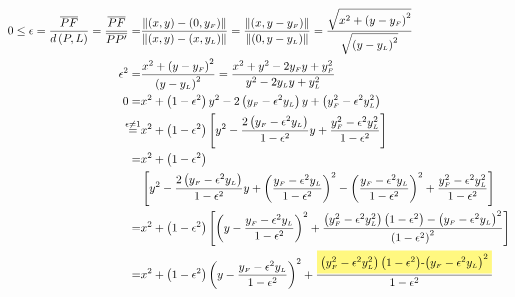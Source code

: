 \documentclass[
]{book}
\theoremstyle{definition}
\theoremstyle{definition}
\theoremstyle{definition}
\theoremstyle{definition}
\theoremstyle{remark}
\begin{document}
\begin{align}
0\le\epsilon=\dfrac{\overline{PF}}{d\left(P,L\right)}=\dfrac{\overline{PF}}{\overline{PP^{\prime}}}= & \dfrac{\left\Vert \left(x,y\right)-\left(0,y_{{\scriptscriptstyle F}}\right)\right\Vert }{\left\Vert \left(x,y\right)-\left(x,y_{{\scriptscriptstyle L}}\right)\right\Vert }=\dfrac{\left\Vert \left(x,y-y_{{\scriptscriptstyle F}}\right)\right\Vert }{\left\Vert \left(0,y-y_{{\scriptscriptstyle L}}\right)\right\Vert }=\dfrac{\sqrt{x^{2}+\left(y-y_{{\scriptscriptstyle F}}\right)^{2}}}{\sqrt{\left(y-y_{{\scriptscriptstyle L}}\right)^{2}}} \label{eq:eccentricity}\\
\epsilon^{2}= & \dfrac{x^{2}+\left(y-y_{{\scriptscriptstyle F}}\right)^{2}}{\left(y-y_{{\scriptscriptstyle L}}\right)^{2}}=\dfrac{x^{2}+y^{2}-2y_{{\scriptscriptstyle F}}y+y_{{\scriptscriptstyle F}}^{2}}{y^{2}-2y_{{\scriptscriptstyle L}}y+y_{{\scriptscriptstyle L}}^{2}}\\
0= & x^{2}+\left(1-\epsilon^{2}\right)y^{2}-2\left(y_{{\scriptscriptstyle F}}-\epsilon^{2}y_{{\scriptscriptstyle L}}\right)y+\left(y_{{\scriptscriptstyle F}}^{2}-\epsilon^{2}y_{{\scriptscriptstyle L}}^{2}\right)\\
\overset{\epsilon\ne1}{=} & x^{2}+\left(1-\epsilon^{2}\right)\left[y^{2}-\dfrac{2\left(y_{{\scriptscriptstyle F}}-\epsilon^{2}y_{{\scriptscriptstyle L}}\right)}{1-\epsilon^{2}}y+\dfrac{y_{{\scriptscriptstyle F}}^{2}-\epsilon^{2}y_{{\scriptscriptstyle L}}^{2}}{1-\epsilon^{2}}\right]\\
= & x^{2}+\left(1-\epsilon^{2}\right)\\
 & \left[y^{2}-\dfrac{2\left(y_{{\scriptscriptstyle F}}-\epsilon^{2}y_{{\scriptscriptstyle L}}\right)}{1-\epsilon^{2}}y+\left(\dfrac{y_{{\scriptscriptstyle F}}-\epsilon^{2}y_{{\scriptscriptstyle L}}}{1-\epsilon^{2}}\right)^{2}-\left(\dfrac{y_{{\scriptscriptstyle F}}-\epsilon^{2}y_{{\scriptscriptstyle L}}}{1-\epsilon^{2}}\right)^{2}+\dfrac{y_{{\scriptscriptstyle F}}^{2}-\epsilon^{2}y_{{\scriptscriptstyle L}}^{2}}{1-\epsilon^{2}}\right]\\
= & x^{2}+\left(1-\epsilon^{2}\right)\left[\left(y-\dfrac{y_{{\scriptscriptstyle F}}-\epsilon^{2}y_{{\scriptscriptstyle L}}}{1-\epsilon^{2}}\right)^{2}+\dfrac{\left(y_{{\scriptscriptstyle F}}^{2}-\epsilon^{2}y_{{\scriptscriptstyle L}}^{2}\right)\left(1-\epsilon^{2}\right)-\left(y_{{\scriptscriptstyle F}}-\epsilon^{2}y_{{\scriptscriptstyle L}}\right)^{2}}{\left(1-\epsilon^{2}\right)^{2}}\right]\\
= & x^{2}+\left(1-\epsilon^{2}\right)\left(y-\dfrac{y_{{\scriptscriptstyle F}}-\epsilon^{2}y_{{\scriptscriptstyle L}}}{1-\epsilon^{2}}\right)^{2}+\dfrac{\colorbox{yellow!50}{\text{\ensuremath{\left(y_{{\scriptscriptstyle F}}^{2}-\epsilon^{2}y_{{\scriptscriptstyle L}}^{2}\right)\left(1-\epsilon^{2}\right)}-\ensuremath{\left(y_{{\scriptscriptstyle F}}-\epsilon^{2}y_{{\scriptscriptstyle L}}\right)^{2}}}}}{1-\epsilon^{2}}
\end{align}
\end{document}
